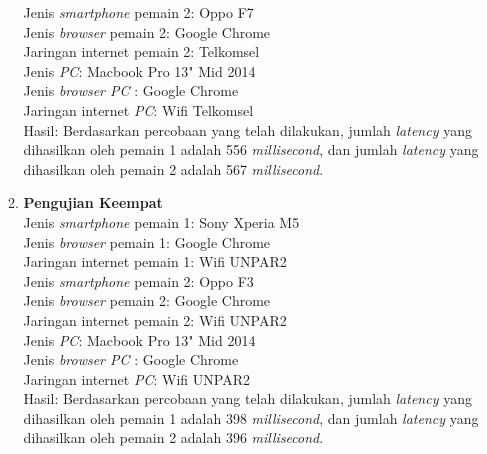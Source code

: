 \begin{enumerate}
\begin{enumerate}
		Jenis \textit{smartphone} pemain 2: Oppo F7\\
		Jenis \textit{browser} pemain 2: Google Chrome\\
		Jaringan internet pemain 2: Telkomsel\\
		
		Jenis \textit{PC}: Macbook Pro 13" Mid 2014\\
		Jenis \textit{browser PC} : Google Chrome\\
		Jaringan internet \textit{PC}: Wifi Telkomsel\\
		
		Hasil: Berdasarkan percobaan yang telah dilakukan, jumlah \textit{latency} yang dihasilkan oleh pemain 1 adalah 556 \textit{millisecond}, dan jumlah \textit{latency} yang dihasilkan oleh pemain 2 adalah 567 \textit{millisecond}.
		
		\item \textbf{Pengujian Keempat} \\ 
		Jenis \textit{smartphone} pemain 1: Sony Xperia M5\\
		Jenis \textit{browser} pemain 1: Google Chrome\\
		Jaringan internet pemain 1: Wifi UNPAR2\\
		
		Jenis \textit{smartphone} pemain 2: Oppo F3\\
		Jenis \textit{browser} pemain 2: Google Chrome\\
		Jaringan internet pemain 2: Wifi UNPAR2\\
		
		Jenis \textit{PC}: Macbook Pro 13" Mid 2014\\
		Jenis \textit{browser PC} : Google Chrome\\
		Jaringan internet \textit{PC}: Wifi UNPAR2\\
		
		Hasil: Berdasarkan percobaan yang telah dilakukan, jumlah \textit{latency} yang dihasilkan oleh pemain 1 adalah 398 \textit{millisecond}, dan jumlah \textit{latency} yang dihasilkan oleh pemain 2 adalah 396 \textit{millisecond}.
		

\end{enumerate}
\end{enumerate}
